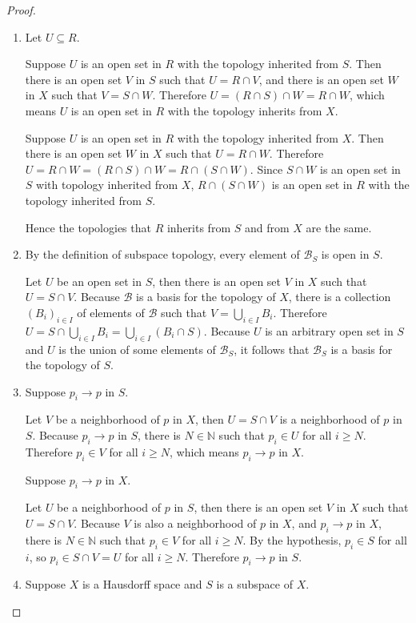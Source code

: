 \begin{proof}
    \begin{enumerate}[label={(\alph*)}]
        \item Let $U\subseteq R$.

              Suppose $U$ is an open set in $R$ with the topology inherited from $S$. Then there is an open set $V$ in $S$ such that $U = R\cap V$, and there is an open set $W$ in $X$ such that $V = S\cap W$. Therefore $U = (R\cap S)\cap W = R\cap W$, which means $U$ is an open set in $R$ with the topology inherits from $X$.

              Suppose $U$ is an open set in $R$ with the topology inherited from $X$. Then there is an open set $W$ in $X$ such that $U = R\cap W$. Therefore $U = R\cap W = (R\cap S)\cap W = R\cap (S\cap W)$. Since $S\cap W$ is an open set in $S$ with topology inherited from $X$, $R\cap (S\cap W)$ is an open set in $R$ with the topology inherited from $S$.

              Hence the topologies that $R$ inherits from $S$ and from $X$ are the same.
        \item By the definition of subspace topology, every element of $\mathscr{B}_{S}$ is open in $S$.

              Let $U$ be an open set in $S$, then there is an open set $V$ in $X$ such that $U = S\cap V$. Because $\mathscr{B}$ is a basis for the topology of $X$, there is a collection ${(B_{i})}_{i\in I}$ of elements of $\mathscr{B}$ such that $V = \bigcup_{i\in I}B_{i}$. Therefore $U = S\cap \bigcup_{i\in I}B_{i} = \bigcup_{i\in I}(B_{i}\cap S)$. Because $U$ is an arbitrary open set in $S$ and $U$ is the union of some elements of $\mathscr{B}_{S}$, it follows that $\mathscr{B}_{S}$ is a basis for the topology of $S$.
        \item Suppose $p_{i}\to p$ in $S$.

              Let $V$ be a neighborhood of $p$ in $X$, then $U = S\cap V$ is a neighborhood of $p$ in $S$. Because $p_{i}\to p$ in $S$, there is $N\in\mathbb{N}$ such that $p_{i}\in U$ for all $i\geq N$. Therefore $p_{i}\in V$ for all $i\geq N$, which means $p_{i}\to p$ in $X$.

              Suppose $p_{i}\to p$ in $X$.

              Let $U$ be a neighborhood of $p$ in $S$, then there is an open set $V$ in $X$ such that $U = S\cap V$. Because $V$ is also a neighborhood of $p$ in $X$, and $p_{i}\to p$ in $X$, there is $N\in\mathbb{N}$ such that $p_{i}\in V$ for all $i\geq N$. By the hypothesis, $p_{i}\in S$ for all $i$, so $p_{i}\in S\cap V = U$ for all $i\geq N$. Therefore $p_{i}\to p$ in $S$.
        \item Suppose $X$ is a Hausdorff space and $S$ is a subspace of $X$.


\end{enumerate}
\end{proof}
